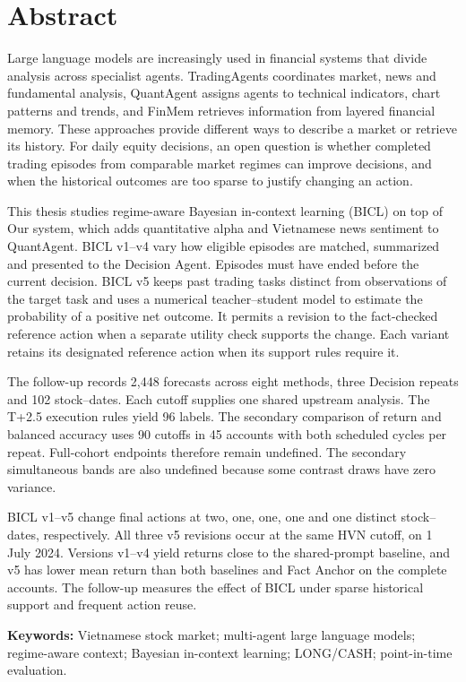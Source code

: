 \chapter*{Abstract}
Large language models are increasingly used in financial systems that
divide analysis across specialist agents. TradingAgents coordinates
market, news and fundamental analysis, QuantAgent assigns agents to
technical indicators, chart patterns and trends, and FinMem retrieves
information from layered financial memory. These approaches provide
different ways to describe a market or retrieve its history. For daily
equity decisions, an open question is whether completed trading episodes
from comparable market regimes can improve decisions, and when the
historical outcomes are too sparse to justify changing an action.

This thesis studies regime-aware Bayesian in-context learning (BICL)
on top of Our system, which adds quantitative alpha and Vietnamese
news sentiment to QuantAgent. BICL v1--v4 vary how eligible episodes
are matched, summarized and presented to the Decision Agent. Episodes
must have ended before the current decision. BICL v5 keeps past
trading tasks distinct from observations of the target task and uses a
numerical teacher--student model to estimate the probability of a
positive net outcome. It permits a revision to the fact-checked
reference action when a separate utility check supports the change.
Each variant retains its designated reference action when its
support rules require it.

The follow-up records 2,448 forecasts across eight methods, three
Decision repeats and 102 stock--dates. Each cutoff supplies one shared
upstream analysis. The T+2.5 execution rules yield 96 labels. The secondary
comparison of return and balanced accuracy uses 90 cutoffs in 45
accounts with both scheduled cycles per repeat. Full-cohort endpoints
therefore remain undefined. The secondary simultaneous bands are also
undefined because some contrast draws have zero variance.

BICL v1--v5 change final actions at two, one, one, one and one distinct
stock--dates, respectively. All three v5 revisions occur at the same
HVN cutoff, on 1 July 2024. Versions v1--v4 yield returns close to the
shared-prompt baseline, and v5 has lower mean return than both baselines
and Fact Anchor on the complete accounts. The follow-up measures the
effect of BICL under sparse historical support and frequent action reuse.

\textbf{Keywords:} Vietnamese stock market; multi-agent large language models; regime-aware
context; Bayesian in-context learning; LONG/CASH; point-in-time evaluation.
